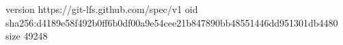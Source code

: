 version https://git-lfs.github.com/spec/v1
oid sha256:d4189e58f492b0ff6b0df00a9e54cee21b847890bb48551446dd951301db4480
size 49248
